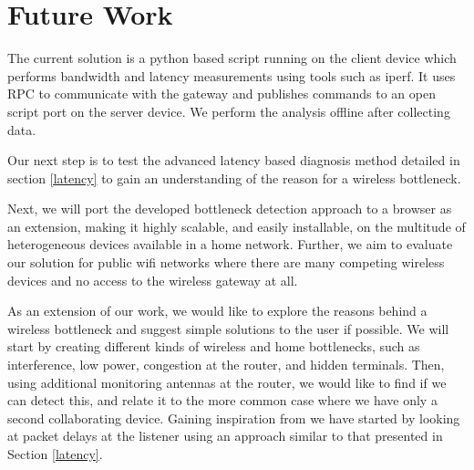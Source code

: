 \section{Future Work}
The current solution is a python based script running on the client device which performs bandwidth and latency measurements using tools such as iperf. It uses RPC to communicate with the gateway and publishes commands to an open script port on the server device. We perform the analysis offline after collecting data.

Our next step is to test the advanced latency based diagnosis method detailed in section \ref{latency} to gain an understanding of the reason for a wireless bottleneck.

Next, we will port the developed bottleneck detection approach to a browser as an extension, making it highly scalable, and easily installable, on the multitude of heterogeneous devices available in a home network. Further, we aim to evaluate our solution for public wifi networks where there are many competing wireless devices and no access to the wireless gateway at all.

As an extension of our work, we would like to explore the reasons behind a wireless bottleneck and suggest simple solutions to the user if possible. We will start by creating different kinds of wireless and home bottlenecks, such as interference, low power, congestion at the router, and hidden terminals. Then, using additional monitoring antennas at the router, we would like to find if we can detect this, and relate it to the more common case where we have only a second collaborating device. Gaining inspiration from \cite{wlanprobe}  we have started by looking at packet delays at the listener using an approach similar to that presented in Section \ref{latency}.